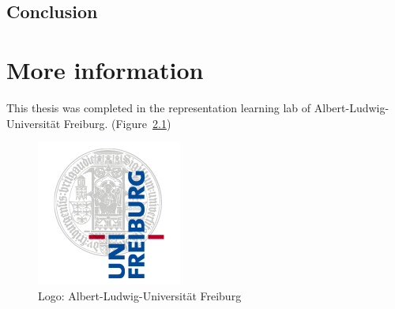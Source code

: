 \documentclass[11pt]{report}
\begin{document}

 
\section{Conclusion}




\appendix
\chapter{More information}
This thesis was completed in the representation learning lab of Albert-Ludwig-Universität Freiburg.  (Figure~\ref{fig:UniLogo})

\begin{figure}[htb]
  \centering
    \includegraphics[scale=0.35]{images/logo}
    \caption{Logo: Albert-Ludwig-Universität Freiburg}
    \label{fig:UniLogo}
\end{figure}
\end{document}

